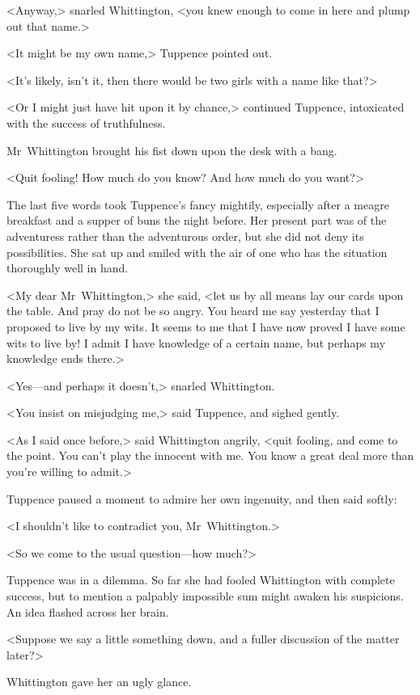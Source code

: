 <Anyway,> snarled Whittington, <you knew enough to come in here and plump out that name.>

<It might be my own name,> Tuppence pointed out.

<It's likely, isn't it, then there would be two girls with a name like that?>

<Or I might just have hit upon it by chance,> continued Tuppence, intoxicated with the success of truthfulness.

Mr~Whittington brought his fist down upon the desk with a bang.

<Quit fooling! How much do you know? And how much do you want?>

The last five words took Tuppence's fancy mightily, especially after a meagre breakfast and a supper of buns the night before. Her present part was of the adventuress rather than the adventurous order, but she did not deny its possibilities. She sat up and smiled with the air of one who has the situation thoroughly well in hand.

<My dear Mr~Whittington,> she said, <let us by all means lay our cards upon the table. And pray do not be so angry. You heard me say yesterday that I proposed to live by my wits. It seems to me that I have now proved I have some wits to live by! I admit I have knowledge of a certain name, but perhaps my knowledge ends there.>

<Yes—and perhaps it doesn't,> snarled Whittington.

<You insist on misjudging me,> said Tuppence, and sighed gently.

<As I said once before,> said Whittington angrily, <quit fooling, and come to the point. You can't play the innocent with me. You know a great deal more than you're willing to admit.>

Tuppence paused a moment to admire her own ingenuity, and then said softly:

<I shouldn't like to contradict you, Mr~Whittington.>

<So we come to the usual question—how much?>

Tuppence was in a dilemma. So far she had fooled Whittington with complete success, but to mention a palpably impossible sum might awaken his suspicions. An idea flashed across her brain.

<Suppose we say a little something down, and a fuller discussion of the matter later?>

Whittington gave her an ugly glance.

